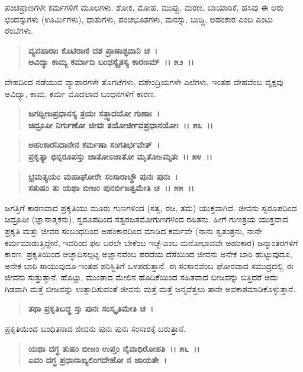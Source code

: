 ಪಂಚಪ್ರಾಣಗಳೇ ಕರ್ಮಗಳಿಗೆ ಮೂಲಗಳು. ಶೋಕ, ಮೋಹ, ಮುಪ್ಪು, ಮರಣ, ಬಾಯಾರಿಕೆ, ಹಸಿವು ಈ ಆರು ಛಂದಸ್ಸುಗಳು (ಊರ್ಮಿಗಳು), ಧಾತುಗಳು, ಪಂಚಭೂತಗಳು, ಮನಸ್ಸು, ಬುದ್ಧಿ, ಅಹಂಕಾರ ಎಂಬ ಎಂಟು ರೆಂಬೆಗಳು.

\begin{verse}
\textbf{ವ್ಯವಹಾರಾಃ ಕೊಟಿರಾಣಿ ದಶ ಪ್ರಾಣಾಶ್ಛದಾನಿ ಚ~।}\\\textbf{ಅವಿದ್ಯಾ ಕಾಮ್ಯ ಕರ್ಮಾದಿ ಬಂಧಸ್ಯೈತಸ್ಯ ಕಾರಣಮ್~।। ೫೨~।।}
\end{verse}

ದೇಹದಿಂದ ನಡೆಯುವ ವ್ಯಾಪಾರಗಳೇ ತೊಗಟೆಗಳು, ದಶೇಂದ್ರಿಯಗಳೇ ಎಲೆಗಳು, ಇಂತಹ ದೇಹವೆಂಬ ವೃಕ್ಷವು ಅವಿದ್ಯಾ, ಕಾಮ, ಕರ್ಮ ಮೊದಲಾದ ಬಂಧನಗಳಿಗೆ ಕಾರಣ.

\begin{verse}
\textbf{ಜಗದ್ಬೀಜಪ್ರಧಾನಸ್ಯ ತ್ರಯಃ ಸತ್ತ್ವಾದಯೋ ಗುಣಾಃ~।}\\\textbf{ಚಿದ್ರೂಪೀ ನಿರ್ಗುಣೋ ಜೀವಃ ತಯೋರ್ಜೀವಪ್ರಧಾನಯೋಃ~।। ೫೩~।। }
\end{verse}

\begin{verse}
\textbf{ಅಹಂಕಾರನಿದಾನೇನ ಕರ್ಮಣಾ ಸಂಗತಿರ್ಭವೇತ್~।}\\\textbf{ಪ್ರಕೃತ್ಯಾ ಛಿನ್ನರೂಪಸ್ತು ಜಾತೋಽಜಾತೋ ಮೃತೋsಮೃತಃ~।। ೫೪~।। }
\end{verse}

\begin{verse}
\textbf{ಭ್ರಮತ್ಯಯಂ ಮಹಾಘೋರೇ ಸಂಸಾರಾಬ್ಧೌ ಪುನಃ ಪುನಃ~।}\\\textbf{ಸತುಷಂ ತು ಯಥಾ ಬೀಜಂ ಪುನರ್ಬಿಜತ್ವಮೇತಿ ಚ~।। ೫೫~।।}
\end{verse}

ಜಗತ್ತಿಗೆ ಕಾರಣವಾದ ಪ್ರಕೃತಿಯು ಮೂರು ಗುಣಗಳಿಂದ (ಸತ್ವ, ರಜ, ತಮ) ಯುಕ್ತವಾಗಿದೆ. ಜೀವನು ಸ್ವರೂಪದಿಂದ ಚಿದ್ರೂಪೀ (ಜ್ಞಾನಾತ್ಮಕನು), ಸ್ವರೂಪದಿಂದ ಸತ್ವರಜತಮೋಗುಣಗಳಿಂದ ರಹಿತನು. ಹೀಗೆ ಗುಣತ್ರಯ ಯುಕ್ತವಾದ ಪ್ರಕೃತಿ ಮತ್ತು ಜೀವರ ಸಂಬಂಧದಿಂದ ಅಹಂಕಾರದಿಂದ ಮಾಡಿದ ಕರ್ಮವೇ (ನಾನು ಸ್ವತಂತ್ರನು, ನಾನೇ ಕರ್ಮಮಾಡುತ್ತಿದ್ದೇನೆ, ಇದರಿಂದ ಫಲ ಬರಲೇ ಬೇಕೆಂಬ ಇಚ್ಛೆ-ಎಂಬ ಮನೋಭಾವವೇ ಅಹಂಕಾರ) ಜನ್ಮಾಂತರಗಳಿಗೆ ಕಾರಣ. ಪ್ರಕೃತಿಯಿಂದ ಆಚ್ಛಾದಿಸಲ್ಪಟ್ಟ ಅಜ್ಞಾನವೆಂಬ ಪರದೆಯ ದೆಸೆಯಿಂದ ಜೀವನು ಅನೇಕ ಬಾರಿ ಹುಟ್ಟುವುದೂ, ಅನೇಕ ಬಾರಿ ಸಾಯು\-ವುದೂ-ಇಂತಹ ಪರಿಸ್ಥಿತಿಗೆ ಒಳಪಡುತ್ತಾನೆ. ಈ ಸಂಸಾರವೆಂಬ ಘೋರವಾದ ಸಮುದ್ರದಲ್ಲಿ ಈ ಜೀವನು ಸುತ್ತುತ್ತಾನೆ. ಹೊಟ್ಟು, ಮುಂತಾದ ಮೇಲಿನ ಹೊದಿಕೆಯಿಂದ ಸಹಿತವಾದ ಬೀಜವನ್ನು ಬಿತ್ತಿದರೆ ಅದು ಗಿಡವಾಗಿ ಮತ್ತೆ ಬೀಜವನ್ನು ಉತ್ಪಾದಿಸುವಂತೆ ಜೀವನು ಮತ್ತೆ ಮತ್ತೆ ಜನ್ಮವೆತ್ತಲು ತಾನೇ ಅವಕಾಶಮಾಡಿಕೊಳ್ಳುತ್ತಾನೆ.

\begin{verse}
\textbf{ತಥಾ ಪ್ರಕೃತಿಬದ್ಧ ಸ್ತು ಪುನಃ ಸಂಸ್ಕೃತಿಮೇತಿ ಚ~।}
\end{verse}

ಪ್ರಕೃತಿಯಿಂದ ಬಂಧಿತನಾದ ಜೀವನು ಪುನಃ ಪುನಃ ಸಂಸಾರಕ್ಕೆ ಬರುತ್ತಾನೆ.

\begin{verse}
\textbf{ಯಥಾ ದಗ್ಧ ತುಷಂ ಬೀಜಂ ಉಪ್ತಂ ನೈವಾಧಿರೋಹತಿ~।। ೫೬~।।}\\\textbf{ಏವಂ ದಗ್ಧ ಪ್ರಧಾನಾಖ್ಯಲಿಂಗದೇಹೋ ನ ಜಾಯತೇ~।}
\end{verse}

